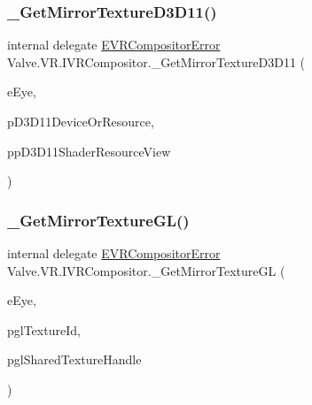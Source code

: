 \mbox{\label{struct_valve_1_1_v_r_1_1_i_v_r_compositor_a9046a6da4f9d12e76f42e8476d698cc5}} 
\subsubsection{\texorpdfstring{\_GetMirrorTextureD3D11()}{\_GetMirrorTextureD3D11()}}
{\footnotesize\ttfamily internal delegate \mbox{\hyperlink{namespace_valve_1_1_v_r_ac34ee1034fda668ccd45f57676ded81b}{E\+V\+R\+Compositor\+Error}} Valve.\+V\+R.\+I\+V\+R\+Compositor.\+\_\+\+Get\+Mirror\+Texture\+D3\+D11 (\begin{DoxyParamCaption}\item[{\mbox{\hyperlink{namespace_valve_1_1_v_r_a8153d4a3e627e1cede046327087c1880}{E\+V\+R\+Eye}}}]{e\+Eye,  }\item[{Int\+Ptr}]{p\+D3\+D11\+Device\+Or\+Resource,  }\item[{ref Int\+Ptr}]{pp\+D3\+D11\+Shader\+Resource\+View }\end{DoxyParamCaption})}

\mbox{\label{struct_valve_1_1_v_r_1_1_i_v_r_compositor_a99ed37ffd770d7a7e9f1cd1c843b0f91}} 
\subsubsection{\texorpdfstring{\_GetMirrorTextureGL()}{\_GetMirrorTextureGL()}}
{\footnotesize\ttfamily internal delegate \mbox{\hyperlink{namespace_valve_1_1_v_r_ac34ee1034fda668ccd45f57676ded81b}{E\+V\+R\+Compositor\+Error}} Valve.\+V\+R.\+I\+V\+R\+Compositor.\+\_\+\+Get\+Mirror\+Texture\+GL (\begin{DoxyParamCaption}\item[{\mbox{\hyperlink{namespace_valve_1_1_v_r_a8153d4a3e627e1cede046327087c1880}{E\+V\+R\+Eye}}}]{e\+Eye,  }\item[{ref uint}]{pgl\+Texture\+Id,  }\item[{Int\+Ptr}]{pgl\+Shared\+Texture\+Handle }\end{DoxyParamCaption})}

